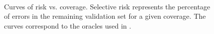 \begin{figure}[!t]
	\centering
	 \hfill
	 \hfill
	\hfill
    \\
	\caption{\label{fig:anal_risk}
    	Curves of risk vs. coverage. Selective risk represents the percentage of errors in the remaining validation set for a given coverage.
    	The curves correspond to the oracles used in .
    	}
\end{figure}